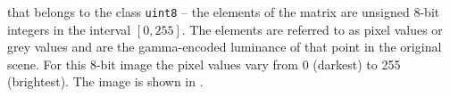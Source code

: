 that belongs to the class \lstinline{uint8} -- the elements of the matrix are unsigned 8-bit integers in the interval $[0,255]$. The elements are referred to as pixel values or grey values and are the gamma-encoded luminance of that point in the original scene. For this 8-bit image the pixel values vary from 0 (darkest) to 255 (brightest). The image is shown in .
